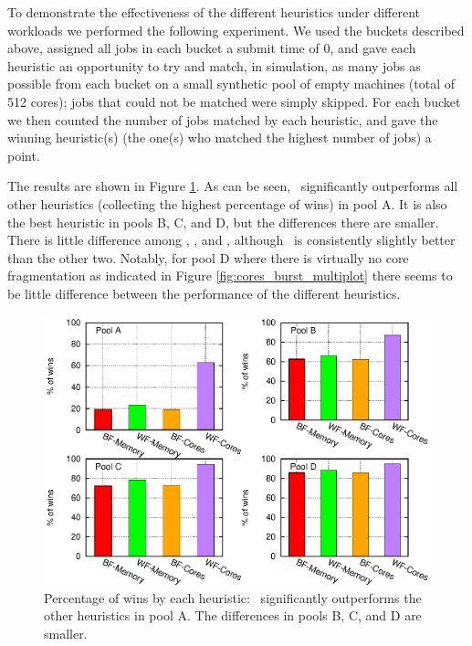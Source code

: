 To demonstrate the effectiveness of the different heuristics under different workloads 
we performed the following experiment.
We used the buckets described above, assigned all jobs in each bucket a submit
time of 0, and gave each heuristic an opportunity to try and match, in simulation, 
as many jobs as possible from each bucket on a small synthetic pool of
empty machines (total of 512 cores);
jobs that could not be matched were simply skipped.
For each bucket we then counted the number of jobs matched by each heuristic, 
and gave the winning heuristic(s) (the one(s) who matched the highest
number of jobs) a point.



The results are shown in Figure \ref{fig:buckets}.
As can be seen, \wfc\ significantly outperforms all other heuristics 
(collecting the highest percentage of wins) in pool A. 
It is also the best heuristic in pools B, C, and D, 
but the differences there are smaller.
There is little difference among \bfm, \wfm, and \bfc, although
\wfm\ is consistently slightly better than the other two.
Notably, for pool D where there is virtually no core fragmentation 
as indicated in Figure \ref{fig:cores_burst_multiplot}
there seems to be little difference between the performance of the
different heuristics.


\begin{figure}\centering                      
	\includegraphics[width=.9\textwidth]{figures/buckets-all-no-mf.eps}
\caption{\label{fig:buckets}Percentage of wins by each heuristic:
  \wfc\ significantly outperforms the other heuristics in pool A. The
  differences in pools B, C, and D are smaller.}
\end{figure}

